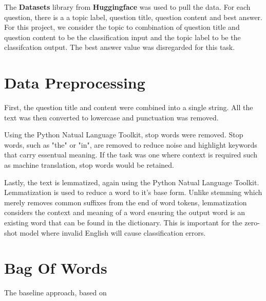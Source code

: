 \documentclass{article}
\begin{document}
The \textbf{Datasets} library from \textbf{Huggingface} was used to pull the data. For each question, there is a a topic label, question title, question content and best answer. For 
this project, we consider the topic to combination of question title and question content to be the classification input and the topic label to be the classifcation output. 
The best answer value was disregarded for this task.

\section{Data Preprocessing}

First, the question title and content were combined into a single string. 
All the text was then converted to lowercase and punctuation was removed.

Using the Python Natual Language Toolkit, stop words were removed. Stop words, such as "the" or "in", are removed to reduce noise and highlight keywords that carry essentual meaning.
If the task was one where context is required such as machine translation, stop words would be retained. 

Lastly, the text is lemmatized, again using the Python Natual Language Toolkit. Lemmatization is used to reduce a word to it's base form. Unlike stemming which merely removes common suffixes from the end of word tokens, lemmatization considers the context and meaning of a word
 ensuring the output word is an existing word that can be found in the dictionary. This is important for the zero-shot model where invalid English will cause classification errors.



\section{Bag Of Words}

The baseline approach, based on 



\end{document}
